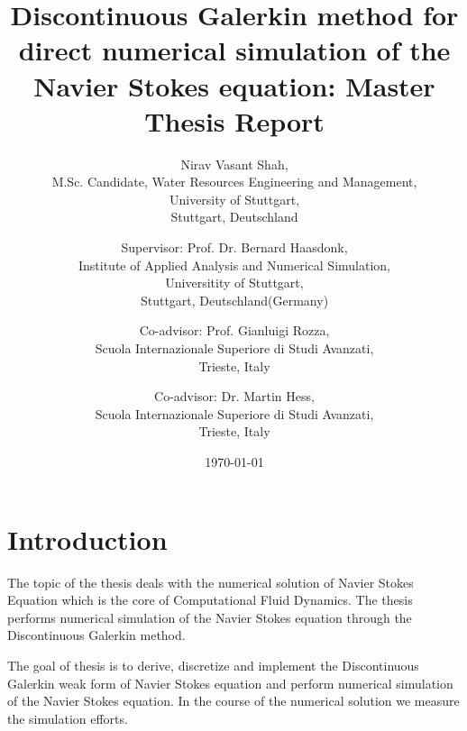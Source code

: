 \documentclass[a4paper,12pt]{book}
\begin{document}
\begin{center}

\title{Discontinuous Galerkin method for direct numerical simulation of the Navier Stokes equation: Master Thesis Report}


\author{Nirav Vasant Shah, \\M.Sc. Candidate, Water Resources Engineering and Management, \\University of Stuttgart, \\Stuttgart, Deutschland\\ 
\and Supervisor: Prof. Dr. Bernard Haasdonk,\\ Institute of Applied Analysis and Numerical Simulation, \\Universitity of Stuttgart,\\ Stuttgart, Deutschland(Germany)\\ \and Co-advisor: Prof. Gianluigi Rozza,\\ Scuola Internazionale Superiore di Studi Avanzati, \\Trieste, Italy \\ \and Co-advisor: Dr. Martin Hess,\\ Scuola Internazionale Superiore di Studi Avanzati, \\Trieste, Italy }
\date{\today}
\maketitle

\end{center}

\tableofcontents

\newenvironment{spmatrix}[1]
 {\def\mysubscript{#1}\mathop\bgroup\begin{pmatrix}}
 {\end{pmatrix}\egroup_{\textstyle\mathstrut\mysubscript}}

\chapter{Introduction}

The topic of the thesis deals with the numerical solution of Navier Stokes Equation which is the core of Computational Fluid Dynamics. The thesis performs numerical simulation of the Navier Stokes equation through the Discontinuous Galerkin method.

The goal of thesis is to derive, discretize and implement the Discontinuous Galerkin weak form of Navier Stokes equation and perform numerical simulation of the Navier Stokes equation. In the course of the numerical solution we measure the simulation efforts.
\end{document}
